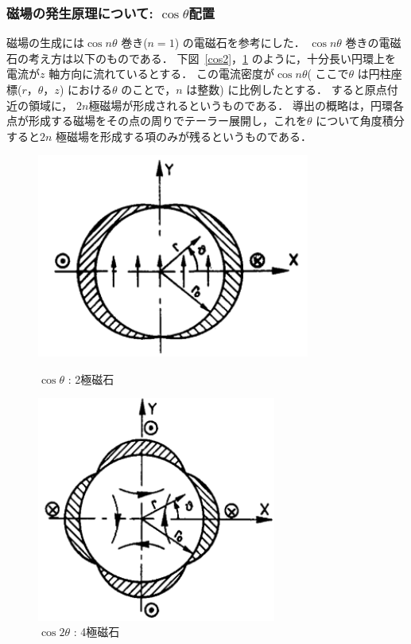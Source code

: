 \subsubsection{磁場の発生原理について: $\cos \theta$配置}
磁場の生成には$\cos n\theta$ 巻き($n=1$) の電磁石を参考にした．
$\cos n \theta$ 巻きの電磁石の考え方は以下のものである．
下図~\ref{cos2}，\ref{cos4} のように，十分長い円環上を電流が$z$ 軸方向に流れているとする．
この電流密度が$\cos n\theta$( ここで$\theta$ は円柱座標($r，\theta，z$) における$\theta$ のことで，$n$ は整数) に比例したとする．
すると原点付近の領域に， $2n$極磁場が形成されるというものである．
導出の概略は，円環各点が形成する磁場をその点の周りでテーラー展開し，これを$\theta$ について角度積分すると$2n$ 極磁場を形成する項のみが残るというものである．

\begin{figure}[H]
  \begin{minipage}{0.45\hsize}
    \begin{center}
      \includegraphics[width=0.8\textwidth]{figure/tajima/cos.png}
    \end{center}
    \caption{$\cos\theta$ : 2極磁石}
    \label{cos2}
  \end{minipage}
  \hfill
  \begin{minipage}{0.45\hsize}
    \begin{center}
      \includegraphics[width=0.7\textwidth]{figure/tajima/cos2.png}
    \end{center}
    \caption{$\cos2\theta$ : 4極磁石}
    \label{cos4}
  \end{minipage}
\end{figure}

